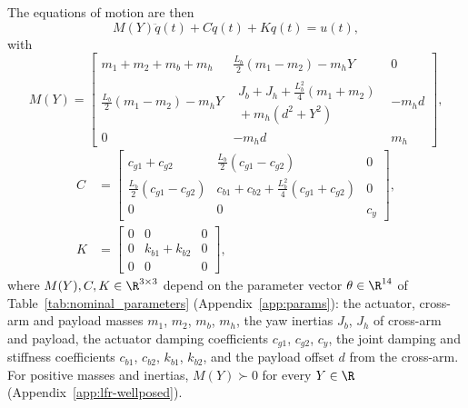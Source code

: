 The equations of motion are then
\begin{equation}
  M(Y)\ddot{q}(t) + C\dot{q}(t) + K q(t) = u(t),
  \label{eq:eom}
\end{equation}
with
{\footnotesize
\setlength{\arraycolsep}{3pt}
\begin{equation}
M(Y)=
\begin{bmatrix}
m_1+m_2+m_b+m_h & \tfrac{L_b}{2}(m_1-m_2)-m_hY & 0\\
\tfrac{L_b}{2}(m_1-m_2)-m_hY &
\substack{J_b+J_h+\tfrac{L_b^2}{4}(m_1+m_2)\\{}+m_h(d^2+Y^2)} & -m_hd\\
0 & -m_hd & m_h
\end{bmatrix},
\label{eq:mass_matrix}
\end{equation}
\begin{equation}
\begin{aligned}
C&=
\begin{bmatrix}
c_{g1}+c_{g2} & \tfrac{L_b}{2}(c_{g1}-c_{g2}) & 0\\
\tfrac{L_b}{2}(c_{g1}-c_{g2}) &
c_{b1}+c_{b2}+\tfrac{L_b^2}{4}(c_{g1}+c_{g2}) & 0\\
0 & 0 & c_y
\end{bmatrix},\\[1ex]
K&=
\begin{bmatrix}
0&0&0\\
0&k_{b1}+k_{b2}&0\\
0&0&0
\end{bmatrix},
\end{aligned}
\label{eq:damping_stiffness_matrices}
\end{equation}
}
where $M(Y),C,K\in\R^{3\times3}$ depend on the parameter vector
$\theta\in\R^{14}$ of Table~\ref{tab:nominal_parameters}
(Appendix~\ref{app:params}): the actuator, cross-arm and payload masses $m_1$,
$m_2$, $m_b$, $m_h$, the yaw inertias $J_b$, $J_h$ of cross-arm and payload,
the actuator damping coefficients $c_{g1}$, $c_{g2}$, $c_y$, the joint damping
and stiffness coefficients $c_{b1}$, $c_{b2}$, $k_{b1}$, $k_{b2}$, and the
payload offset $d$ from the cross-arm.
For positive masses and inertias, $M(Y)\succ0$ for every $Y\in\R$
(Appendix~\ref{app:lfr-wellposed}).

